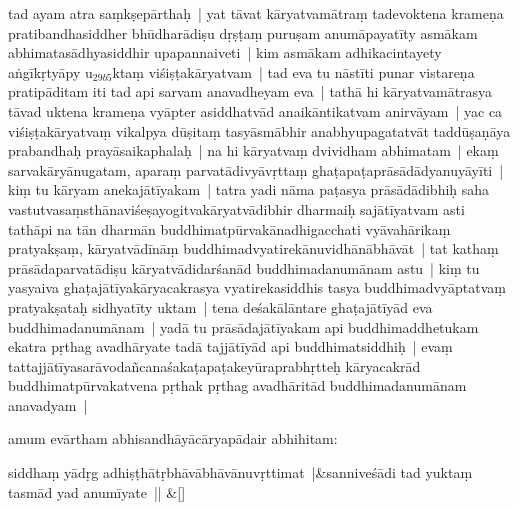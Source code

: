 \documentclass[article,12pt,a4paper]{memoir}%
\newcounter{parCount}
\begin{document}
	  
	  \pstart \leavevmode%
	\label{thakur75-52.22}tad ayam atra saṃkṣepārthaḥ | yat tāvat kāryatvamātraṃ tadevoktena krameṇa pratibandhasiddher bhūdharādiṣu dṛṣṭaṃ puruṣam anumāpayatīty asmākam abhimata\label{ratnakīrtinibandhāvali__36r1PF7IMUXEUF5YNC0LPJ2WOMW}sādhyasiddhir\label{ratnakīrtinibandhāvali__36r1PF7IMUWHI4JVCPCDFPY7PX4} upapannaiveti | kim asmākam adhikacintayety aṅgīkṛtyāpy u{\tiny $_{29b5}$}ktaṃ viśiṣṭakāryatvam | tad eva tu nāstīti punar vistareṇa pratipāditam iti tad api sarvam anavadheyam eva | tathā hi kāryatvamātrasya tāvad uktena krameṇa vyāpter asiddhatvād anaikāntikatvam anirvāyam | yac ca viśiṣṭakāryatvaṃ vikalpya dūṣitaṃ tasyāsmābhir anabhyupagatatvāt taddūṣaṇāya prabandhaḥ prayāsaikaphalaḥ | na hi kāryatvaṃ dvividham abhimatam | ekaṃ sarvakāryānugatam, aparaṃ parvatādivyāvṛttaṃ ghaṭapaṭaprāsādādyanuyāyīti | kiṃ tu kāryam anekajātīyakam | tatra yadi nāma paṭasya prāsādādibhiḥ saha vastutvasaṃsthānaviśeṣayogitvakāryatvādibhir dharmaiḥ sajātīyatvam asti tathāpi na tān dharmān buddhimatpūrvakānadhigacchati vyāvahārikaṃ pratyakṣaṃ, kāryatvādīnāṃ buddhimadvyatirekānuvidhānābhāvāt | tat kathaṃ prāsādaparvatādiṣu kāryatvādidarśanād buddhimadanumānam astu | kiṃ tu yasyaiva ghaṭajātīyakāryacakrasya vyatirekasiddhis tasya buddhimadvyāptatvaṃ pratyakṣataḥ sidhyatīty uktam | tena deśakālāntare ghaṭajātīyād eva buddhimadanumānam | yadā tu prāsādajātīyakam api buddhimaddhetukam ekatra pṛthag avadhāryate tadā tajjātīyād api buddhimatsiddhiḥ | evaṃ tattajjātīyasarāvodañcanaśakaṭapaṭakeyūraprabhṛtteḥ kāryacakrād buddhimatpūrvakatvena pṛthak pṛthag avadhāritād buddhimadanumānam anavadyam |
	{}
	\pend%
      

	  
	  \pstart \leavevmode%
	amum evārtham abhisandhāyācāryapādair abhihitam:
	{}
	\pend%
      
	    
	    \stanza[\smallbreak]
	  siddhaṃ yādṛg adhiṣṭhātṛbhāvābhāvānuvṛttimat |&sanniveśādi tad yuktaṃ tasmād yad anumīyate || \&[\smallbreak]
	  
\end{document}
